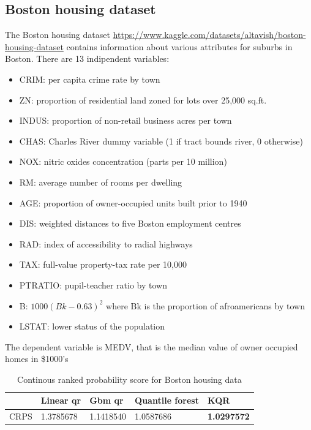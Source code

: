 \subsection{Boston housing dataset}
The Boston housing dataset \href{https://www.kaggle.com/datasets/altavish/boston-housing-dataset}{https://www.kaggle.com/datasets/altavish/boston-housing-dataset} contains information about various attributes for suburbs in Boston.
There are 13 indipendent variables:
\begin{itemize}
\item CRIM: per capita crime rate by town
\item ZN: proportion of residential land zoned for lots over 25,000 sq.ft.\
\item INDUS: proportion of non-retail business acres per town
\item CHAS: Charles River dummy variable (1 if tract bounds river, 0 otherwise)
\item NOX: nitric oxides concentration (parts per 10 million)
\item RM: average number of rooms per dwelling
\item AGE: proportion of owner-occupied units built prior to 1940
\item DIS: weighted distances to five Boston employment centres
\item RAD: index of accessibility to radial highways
\item TAX: full-value property-tax rate per 10,000
\item PTRATIO: pupil-teacher ratio by town
\item B: $1000(Bk - 0.63)^2$ where Bk is the proportion of afroamericans by town
\item LSTAT: lower status of the population
\end{itemize}
The dependent variable is MEDV, that is the median value of owner occupied homes in \$1000's

\begin{table}
\caption{Continous ranked probability score for Boston housing data}
\begin{tabular}{lllll}
\toprule
    & Linear qr & Gbm qr & Quantile forest & KQR \\
\midrule
CRPS & 1.3785678 & 1.1418540 & 1.0587686 & \textbf{1.0297572} \\
\bottomrule
\end{tabular}
\end{table}

